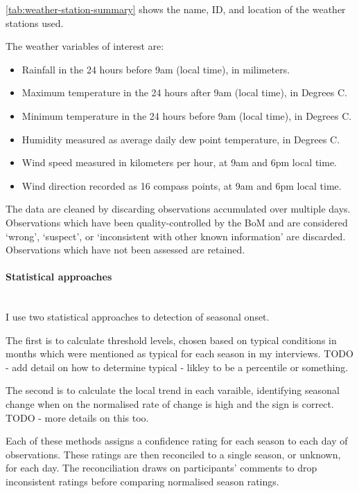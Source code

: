 \autoref{tab:weather-station-summary} shows the name, ID, and location of
the weather stations used.

The weather variables of interest are:
\begin{itemize}
\item Rainfall in the 24 hours before 9am (local time), in milimeters.
\item Maximum temperature in the 24 hours after 9am (local time), in Degrees C.
\item Minimum temperature in the 24 hours before 9am (local time), in Degrees C.
\item Humidity measured as average daily dew point temperature, in Degrees C.
\item Wind speed measured in kilometers per hour, at 9am and 6pm local time.
\item Wind direction recorded as 16 compass points, at 9am and 6pm local time.
\end{itemize}

The data are cleaned by discarding observations accumulated over multiple days.
Observations which have been quality-controlled by the BoM and are considered
`wrong', `suspect', or `inconsistent with other known information' are discarded.
Observations which have not been assessed are retained.


\paragraph{Statistical approaches}~\\
I use two statistical approaches to detection of seasonal onset.

The first is to calculate threshold levels, chosen based on typical conditions
in months which were mentioned as typical for each season in my interviews.
TODO - add detail on how to determine typical - likley to be a percentile or something.

The second is to calculate the local trend in each varaible, identifying seasonal
change when on the normalised rate of change is high and the sign is correct.
TODO - more details on this too.

Each of these methods assigns a confidence rating for each season to each day of
observations.  These ratings are then reconciled to a single season, or unknown,
for each day.  The reconciliation draws on participants' comments to drop inconsistent
ratings before comparing normalised season ratings.







